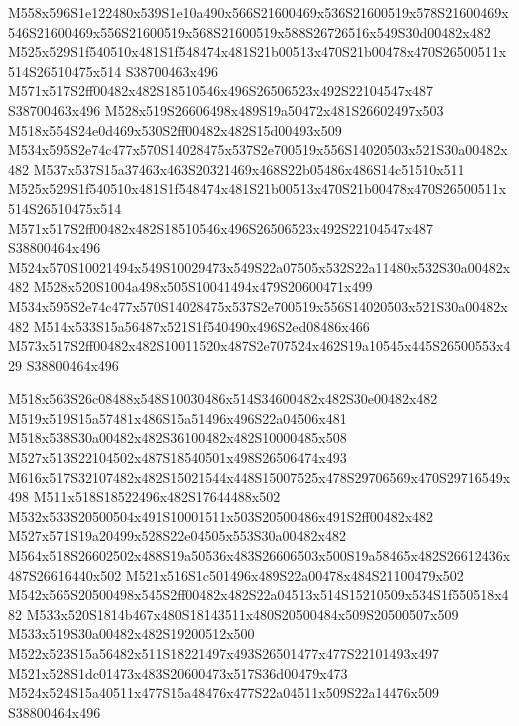 \documentclass{article}
\begin{document}
\begin{multicols}{2}
M558x596S1e122480x539S1e10a490x566S21600469x536S21600519x578S21600469x546S21600469x556S21600519x568S21600519x588S26726516x549S30d00482x482 M525x529S1f540510x481S1f548474x481S21b00513x470S21b00478x470S26500511x514S26510475x514 S38700463x496 M571x517S2ff00482x482S18510546x496S26506523x492S22104547x487 S38700463x496 M528x519S26606498x489S19a50472x481S26602497x503 M518x554S24e0d469x530S2ff00482x482S15d00493x509 M534x595S2e74c477x570S14028475x537S2e700519x556S14020503x521S30a00482x482 M537x537S15a37463x463S20321469x468S22b05486x486S14c51510x511 M525x529S1f540510x481S1f548474x481S21b00513x470S21b00478x470S26500511x514S26510475x514 M571x517S2ff00482x482S18510546x496S26506523x492S22104547x487 S38800464x496 M524x570S10021494x549S10029473x549S22a07505x532S22a11480x532S30a00482x482 M528x520S1004a498x505S10041494x479S20600471x499 M534x595S2e74c477x570S14028475x537S2e700519x556S14020503x521S30a00482x482 M514x533S15a56487x521S1f540490x496S2ed08486x466 M573x517S2ff00482x482S10011520x487S2e707524x462S19a10545x445S26500553x429 S38800464x496

M518x563S26c08488x548S10030486x514S34600482x482S30e00482x482 M519x519S15a57481x486S15a51496x496S22a04506x481 M518x538S30a00482x482S36100482x482S10000485x508 M527x513S22104502x487S18540501x498S26506474x493 M616x517S32107482x482S15021544x448S15007525x478S29706569x470S29716549x498 M511x518S18522496x482S17644488x502 M532x533S20500504x491S10001511x503S20500486x491S2ff00482x482 M527x571S19a20499x528S22e04505x553S30a00482x482 M564x518S26602502x488S19a50536x483S26606503x500S19a58465x482S26612436x487S26616440x502 M521x516S1c501496x489S22a00478x484S21100479x502 M542x565S20500498x545S2ff00482x482S22a04513x514S15210509x534S1f550518x482 M533x520S1814b467x480S18143511x480S20500484x509S20500507x509 M533x519S30a00482x482S19200512x500 M522x523S15a56482x511S18221497x493S26501477x477S22101493x497 M521x528S1dc01473x483S20600473x517S36d00479x473 M524x524S15a40511x477S15a48476x477S22a04511x509S22a14476x509 S38800464x496


\end{multicols}
\end{document}
